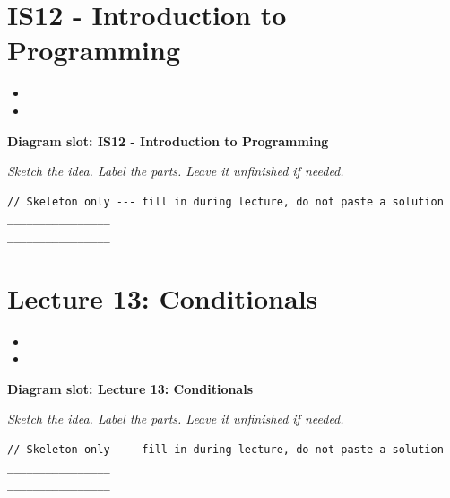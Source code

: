 \documentclass[11pt]{article}
\begin{document}
\section{IS12 - Introduction to Programming}
\begin{itemize}[leftmargin=*]
  \item \hrulefill
  \vspace{2.4em}
  \item \hrulefill
  \vspace{2.4em}
\end{itemize}
\noindent\textbf{Diagram slot: IS12 - Introduction to Programming}
\begin{framed}
\begin{minipage}[t][0.22\textheight]{\textwidth}
\vspace{0.4em}
\textit{Sketch the idea. Label the parts. Leave it unfinished if needed.}
\end{minipage}
\end{framed}
\vspace{1em}
\begin{lstlisting}
// Skeleton only --- fill in during lecture, do not paste a solution
________________
________________
\end{lstlisting}
\vspace{1em}
\section{Lecture 13: Conditionals}
\begin{itemize}[leftmargin=*]
  \item \hrulefill
  \vspace{2.4em}
  \item \hrulefill
  \vspace{2.4em}
\end{itemize}
\noindent\textbf{Diagram slot: Lecture 13: Conditionals}
\begin{framed}
\begin{minipage}[t][0.22\textheight]{\textwidth}
\vspace{0.4em}
\textit{Sketch the idea. Label the parts. Leave it unfinished if needed.}
\end{minipage}
\end{framed}
\vspace{1em}
\begin{lstlisting}
// Skeleton only --- fill in during lecture, do not paste a solution
________________
________________
\end{lstlisting}
\vspace{1em}
\end{document}
